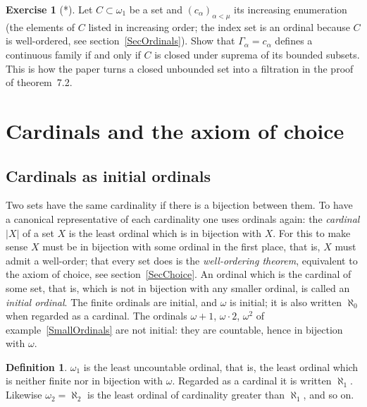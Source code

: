 \documentclass[12pt]{article}
\theoremstyle{definition}
\newtheorem{definition}[theorem]{Definition}
\newtheorem{exercise}[theorem]{Exercise}
\theoremstyle{remark}
\begin{document}
\begin{exercise}[*] Let $C\subset\omega_1$ be a set and
    ${(c_\alpha)}_{\alpha<\mu}$ its increasing enumeration (the elements of
    $C$ listed in increasing order; the index set is an ordinal because $C$
    is well-ordered, see section~\ref{SecOrdinals}). Show that $\Gamma_\alpha=c_\alpha$ defines a
    continuous family if and only if $C$ is closed under suprema of its
    bounded subsets. This is how the paper turns a closed unbounded set into
    a filtration in the proof of theorem~7.2.
\end{exercise}

\section{Cardinals and the axiom of choice}\label{SecCardinals}

\subsection{Cardinals as initial ordinals}

Two sets have the same cardinality if there is a bijection between them. To
have a canonical representative of each cardinality one uses ordinals again:
the \emph{cardinal} $|X|$ of a set $X$ is the least ordinal which is in
bijection with $X$. For this to make sense $X$ must be in bijection with some
ordinal in the first place, that is, $X$ must admit a well-order; that every set does is
the \emph{well-ordering theorem}, equivalent to the axiom of choice, see
section~\ref{SecChoice}. An ordinal which is the cardinal of some set, that
is, which is not in bijection with any smaller ordinal, is called an
\emph{initial ordinal}. The finite ordinals are initial, and $\omega$ is
initial; it is also written $\aleph_0$ when regarded as a cardinal. The
ordinals $\omega+1$, $\omega\cdot 2$, $\omega^2$ of example~\ref{SmallOrdinals}
are not initial: they are countable, hence in bijection with $\omega$.

\begin{definition} $\omega_1$ is the least uncountable ordinal, that is, the
    least ordinal which is neither finite nor in bijection with $\omega$. Regarded as a cardinal it
    is written $\aleph_1$. Likewise $\omega_2=\aleph_2$ is the least ordinal
    of cardinality greater than $\aleph_1$, and so on.
\end{definition}
\end{document}
